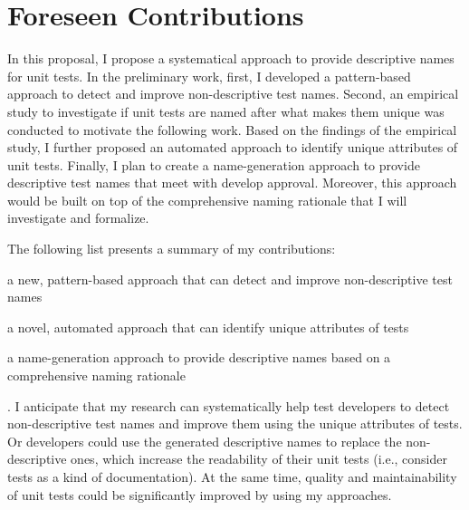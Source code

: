 \section{Foreseen Contributions}
\label{sec:contributions}

In this proposal, I propose a systematical approach to provide descriptive names for unit tests.
%
In the preliminary work, first, I developed a pattern-based approach to detect and improve non-descriptive test names.
%
Second, an empirical study to investigate if unit tests are named after what makes them unique was conducted to motivate the following work.
%
Based on the findings of the empirical study, I further proposed an automated approach to identify unique attributes of unit tests.
%
Finally, I plan to create a name-generation approach to provide descriptive test names that meet with develop approval.
%
Moreover, this approach would be built on top of the comprehensive naming rationale that I will investigate and formalize.

The following list presents a summary of my contributions:
\begin{enumerate*}
    \item a new, pattern-based approach that can detect and improve non-descriptive test names
    \item a novel, automated approach that can identify unique attributes of tests
    \item a name-generation approach to provide descriptive names based on a comprehensive naming rationale
\end{enumerate*}.
%
I anticipate that my research can systematically help test developers to detect non-descriptive test names and improve them using the unique attributes of tests.
%
Or developers could use the generated descriptive names to replace the non-descriptive ones, which increase the readability of their unit tests (i.e., consider tests as a kind of documentation).
%
At the same time, quality and maintainability of unit tests could be significantly improved by using my approaches.